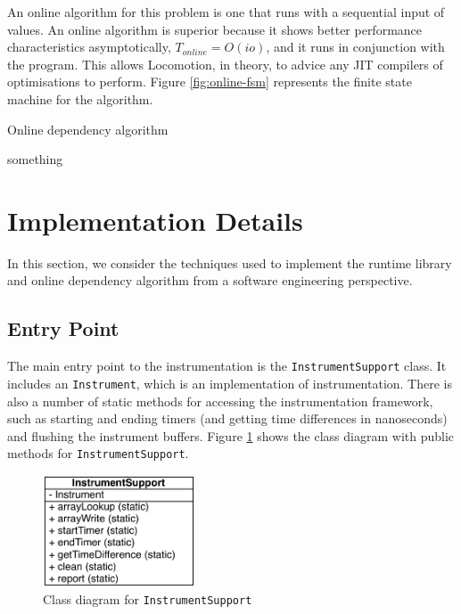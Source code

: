 	An online algorithm for this problem is one that runs with a sequential input of values. An online algorithm is superior because it shows better performance characteristics asymptotically, $T_{online} = O(io)$, and it runs in conjunction with the program. This allows Locomotion, in theory, to advice any JIT compilers of optimisations to perform. Figure \ref{fig:online-fsm} represents the finite state machine for the algorithm.
	
	\begin{algorithm}
		\caption{Online dependency algorithm}
		\label{alg:online-dependency}
		\begin{algorithmic}
			\STATE something
		\end{algorithmic}
	\end{algorithm}

\section{Implementation Details} \label{sec:runtime/implementation}
In this section, we consider the techniques used to implement the runtime library and online dependency algorithm from a software engineering perspective.

	\subsection{Entry Point} \label{sec:runtime/implementation/entry-point}
	The main entry point to the instrumentation is the \texttt{InstrumentSupport} class. It includes an \texttt{Instrument}, which is an implementation of instrumentation. There is also a number of static methods for accessing the instrumentation framework, such as starting and ending timers (and getting time differences in nanoseconds) and flushing the instrument buffers. Figure \ref{fig:instrument-support} shows the class diagram with public methods for \texttt{InstrumentSupport}.
	
	\begin{figure}
		\centering
		\includegraphics[width=0.4\textwidth]{graphics/instrument-support.pdf}
		\caption{Class diagram for \texttt{InstrumentSupport}}
		\label{fig:instrument-support}
	\end{figure}
	
